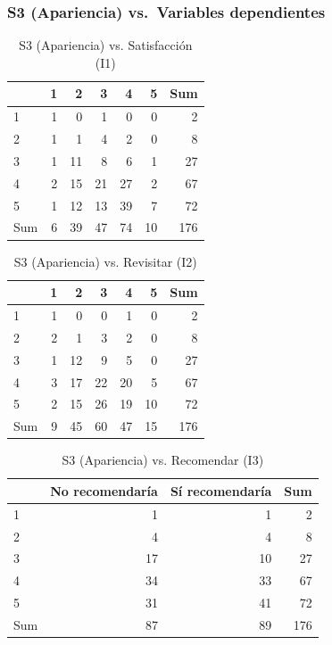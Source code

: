 \documentclass[
  spanish,
]{article}
\begin{document}
\subsubsection{S3 (Apariencia) vs.~Variables
dependientes}\label{s3-apariencia-vs.-variables-dependientes}

\begin{longtable}[t]{lrrrrrr}
\caption{\label{tab:cont-s3-satisf}S3 (Apariencia) vs. Satisfacción (I1)}\\
\toprule
 & 1 & 2 & 3 & 4 & 5 & Sum\\
\midrule
1 & 1 & 0 & 1 & 0 & 0 & 2\\
2 & 1 & 1 & 4 & 2 & 0 & 8\\
3 & 1 & 11 & 8 & 6 & 1 & 27\\
4 & 2 & 15 & 21 & 27 & 2 & 67\\
5 & 1 & 12 & 13 & 39 & 7 & 72\\
\addlinespace
Sum & 6 & 39 & 47 & 74 & 10 & 176\\
\bottomrule
\end{longtable}

\begin{longtable}[t]{lrrrrrr}
\caption{\label{tab:cont-s3-revis}S3 (Apariencia) vs. Revisitar (I2)}\\
\toprule
 & 1 & 2 & 3 & 4 & 5 & Sum\\
\midrule
1 & 1 & 0 & 0 & 1 & 0 & 2\\
2 & 2 & 1 & 3 & 2 & 0 & 8\\
3 & 1 & 12 & 9 & 5 & 0 & 27\\
4 & 3 & 17 & 22 & 20 & 5 & 67\\
5 & 2 & 15 & 26 & 19 & 10 & 72\\
\addlinespace
Sum & 9 & 45 & 60 & 47 & 15 & 176\\
\bottomrule
\end{longtable}

\begin{longtable}[t]{lrrr}
\caption{\label{tab:cont-s3-recom}S3 (Apariencia) vs. Recomendar (I3)}\\
\toprule
 & No recomendaría & Sí recomendaría & Sum\\
\midrule
1 & 1 & 1 & 2\\
2 & 4 & 4 & 8\\
3 & 17 & 10 & 27\\
4 & 34 & 33 & 67\\
5 & 31 & 41 & 72\\
\addlinespace
Sum & 87 & 89 & 176\\
\bottomrule
\end{longtable}
\end{document}
